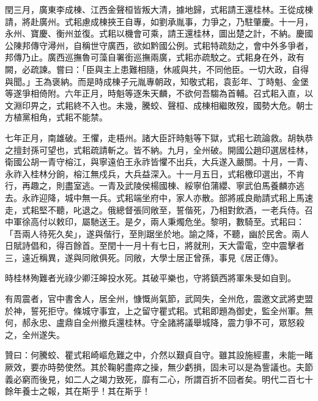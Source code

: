 \begin{pinyinscope}
閏三月，廣東李成棟、江西金聲桓皆叛大清，據地歸，式耜請王還桂林。王從成棟請，將赴廣州。式耜慮成棟挾王自專，如劉承胤事，力爭之，乃駐肇慶。十一月，永州、寶慶、衡州並復。式耜以機會可乘，請王還桂林，圖出楚之計，不納。慶國公陳邦傳守潯州，自稱世守廣西，欲如黔國公例。式耜特疏劾之，會中外多爭者，邦傳乃止。廣西巡撫魯可藻自署銜巡撫兩廣，式耜亦疏駮之。式耜身在外，政有闕，必疏諫。嘗曰：「臣與主上患難相隨，休戚與共，不同他臣。一切大政，自得與聞。」王為褒納。而是時成棟子元胤專朝政，知敬式耜，袁彭年、丁時魁、金堡等遂爭相倚附。六年正月，時魁等逐朱天麟，不欲何吾騶為首輔。召式耜入直，以文淵印畀之，式耜終不入也。未幾，騰蛟、聲桓、成棟相繼敗歿，國勢大危。朝士方植黨相角，式耜不能禁。

七年正月，南雄破。王懼，走梧州。諸大臣訐時魁等下獄，式耜七疏論救。胡執恭之擅封孫可望也，式耜疏請斬之。皆不納。九月，全州破。開國公趙印選居桂林，衛國公胡一青守榕江，與寧遠伯王永祚皆懼不出兵，大兵遂入嚴關。十月，一青、永祚入桂林分餉，榕江無戍兵，大兵益深入。十一月五日，式耜檄印選出，不肯行，再趣之，則盡室逃。一青及武陵侯楊國棟、綏寧伯蒲纓、寧武伯馬養麟亦逃去。永祚迎降，城中無一兵。式耜端坐府中，家人亦散。部將戚良勛請式耜上馬速走，式耜堅不聽，叱退之。俄總督張同敞至，誓偕死，乃相對飲酒，一老兵侍。召中軍徐高付以敕印，屬馳送王。是夕，兩人秉燭危坐。黎明，數騎至。式耜曰：「吾兩人待死久矣」，遂與偕行，至則踞坐於地。諭之降，不聽，幽於民舍。兩人日賦詩倡和，得百餘首。至閏十一月十有七日，將就刑，天大雷電，空中震擊者三，遠近稱異，遂與同敞俱死。同敞，大學士居正曾孫，事見《居正傳》。

時桂林殉難者光祿少卿汪皞投水死。其破平樂也，守將鎮西將軍朱旻如自剄。

有周震者，官中書舍人，居全州，慷慨尚氣節，武岡失，全州危，震邀文武將吏盟於神，誓死拒守。條城守事宜，上之留守瞿式耜。式耜即題為御史，監全州軍。無何，郝永忠、盧鼎自全州撤兵還桂林。守全諸將議舉城降，震力爭不可，眾怒殺之，全州遂失。

贊曰：何騰蛟、瞿式耜崎嶇危難之中，介然以艱貞自守。雖其設施經畫，未能一睹厥效，要亦時勢使然。其於鞠躬盡瘁之操，無少虧損，固未可以是為訾議也。夫節義必窮而後見，如二人之竭力致死，靡有二心，所謂百折不回者矣。明代二百七十餘年養士之報，其在斯乎！其在斯乎！


\end{pinyinscope}